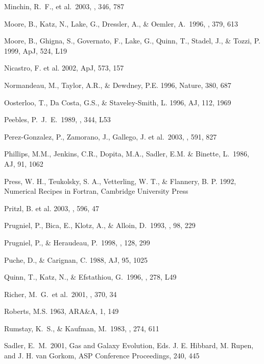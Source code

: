 \documentclass[12pt,preprint]{emulateapj}
\begin{document}
\begin{thebibliography}{}
Minchin, R.~F., et al.\ 2003, \mnras, 346, 787 

Moore, B., Katz, N., Lake, G., Dressler, A., \& Oemler, A.\ 1996, \nat, 379, 613 

Moore, B., Ghigna, S., Governato, F., Lake, G., Quinn, T., Stadel, J., \&
Tozzi, P. 1999, ApJ, 524, L19

Nicastro, F. et al. 2002, ApJ, 573, 157

Normandeau, M., Taylor, A.R., \& Dewdney, P.E. 1996, Nature, 380, 687

Oosterloo, T., Da Costa, G.S., \& Staveley-Smith, L. 1996, AJ, 112, 1969

Peebles, P.~J.~E.\ 1989, \apjl, 344, L53 

Perez-Gonzalez, P., Zamorano, J., Gallego, J. et al.\ 2003, \apj, 591, 827 

Phillips, M.M., Jenkins, C.R., Dopita, M.A., Sadler, E.M. \& Binette, L.\ 1986, AJ, 91, 1062

Press, W. H., Teukolsky, S. A., Vetterling, W. T., \& Flannery, B. P. 1992,
Numerical Recipes in Fortran, Cambridge University Press

Pritzl, B. et al. 2003, \apj, 596, 47

Prugniel, P., Bica, E., Klotz, A., \& Alloin, D.\ 1993, \aaps, 98, 229 

Prugniel, P., \& Heraudeau, P.\ 1998, \aaps, 128, 299 

Puche, D., \& Carignan, C. 1988, AJ, 95, 1025

Quinn, T., Katz, N., \& Efstathiou, G.\ 1996, \mnras, 278, L49 

Richer, M.~G.~et al.\ 2001, \aap, 370, 34 

Roberts, M.S. 1963, ARA\&A, 1, 149

Rumstay, K.~S., \& Kaufman, M.\ 1983, \apj, 274, 611 

Sadler, E.~M.\ 2001, Gas and Galaxy Evolution, 
Eds. J. E. Hibbard, M. Rupen, and J. H. van Gorkom,
ASP Conference Proceedings, 240, 445 


\end{thebibliography}
\end{document}
